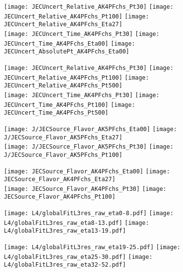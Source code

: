 \documentclass[landscape,10pt]{beamer} %
\begin{document}
{\newpage 

\begin{figure}[p]
\centering
  \texttt{[image: JECUncert\_Relative\_AK4PFchs\_Pt30]}
  \texttt{[image: JECUncert\_Relative\_AK4PFchs\_Pt100]}
  \texttt{[image: JECUncert\_Relative\_AK4PFchs\_Eta27]}\\
  \texttt{[image: JECUncert\_Time\_AK4PFchs\_Pt30]}
  \texttt{[image: JECUncert\_Time\_AK4PFchs\_Eta00]}
  \texttt{[image: JECUncert\_AbsolutePt\_AK4PFchs\_Eta00]}
\end{figure}

\newpage

\begin{figure}[p]
\centering
  \texttt{[image: JECUncert\_Relative\_AK4PFchs\_Pt30]}
  \texttt{[image: JECUncert\_Relative\_AK4PFchs\_Pt100]}
  \texttt{[image: JECUncert\_Relative\_AK4PFchs\_Pt500]}\\
  \texttt{[image: JECUncert\_Time\_AK4PFchs\_Pt30]}
  \texttt{[image: JECUncert\_Time\_AK4PFchs\_Pt100]}
  \texttt{[image: JECUncert\_Time\_AK4PFchs\_Pt500]}
\end{figure}

\newpage

\begin{figure}[p]
\centering
\texttt{[image: J/JECSource\_Flavor\_AK5PFchs\_Eta00]}
\texttt{[image: J/JECSource\_Flavor\_AK5PFchs\_Eta27]}\\
\texttt{[image: J/JECSource\_Flavor\_AK5PFchs\_Pt30]}
\texttt{[image: J/JECSource\_Flavor\_AK5PFchs\_Pt100]}
\end{figure}

\newpage
\begin{figure}[p]
\centering
\texttt{[image: JECSource\_Flavor\_AK4PFchs\_Eta00]}
\texttt{[image: JECSource\_Flavor\_AK4PFchs\_Eta27]}\\
\texttt{[image: JECSource\_Flavor\_AK4PFchs\_Pt30]}
\texttt{[image: JECSource\_Flavor\_AK4PFchs\_Pt100]}
\end{figure}

\newpage

\begin{figure}[p]
\centering
  \texttt{[image: L4/globalFitL3res\_raw\_eta0-8.pdf]}
  \texttt{[image: L4/globalFitL3res\_raw\_eta8-13.pdf]}
  \texttt{[image: L4/globalFitL3res\_raw\_eta13-19.pdf]}
\end{figure}
\begin{figure}[p]
\centering
  \texttt{[image: L4/globalFitL3res\_raw\_eta19-25.pdf]}
  \texttt{[image: L4/globalFitL3res\_raw\_eta25-30.pdf]}
  \texttt{[image: L4/globalFitL3res\_raw\_eta32-52.pdf]}
\end{figure}

}
\end{document}
